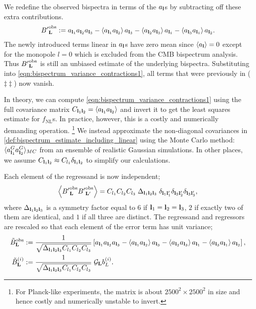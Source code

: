 We redefine the observed bispectra in terms of the $a_\mathbf{l}$s by subtracting off these extra contributions.
\begin{align}
	{B'}^\text{obs}_\mathbf{L} := a_{\mathbf{l}_1} a_{\mathbf{l}_2} a_{\mathbf{l}_3} - \left< a_{\mathbf{l}_1} a_{\mathbf{l}_2} \right> a_{\mathbf{l}_3} - \left< a_{\mathbf{l}_2} a_{\mathbf{l}_3} \right> a_{\mathbf{l}_1} - \left< a_{\mathbf{l}_3} a_{\mathbf{l}_1} \right> a_{\mathbf{l}_2}. \label{def:bispectrum_estimate_including_linear}
\end{align}
The newly introduced terms linear in $a_\mathbf{l}$s have zero mean since $\left< a_\mathbf{l} \right> = 0$ except for the monopole $l=0$ which is excluded from the CMB bispectrum analysis. Thus ${B'}^\text{obs}_\mathbf{L}$ is still an unbiased estimate of the underlying bispectra. Substituting into \eqref{eqn:bispectrum_variance_contractions1}, all terms that were previously in ($\ddagger\ddagger$) now vanish.

In theory, we can compute \eqref{eqn:bispectrum_variance_contractions1} using the full covariance matrix $C_{\mathbf{l}_1 \mathbf{l}_2} = \left< a_{\mathbf{l}_1} a_{\mathbf{l}_2} \right>$ and invert it to get the least squares estimate for $f_\text{NL}$s. In practice, however, this is a costly and numerically demanding operation. \footnote{For Planck-like experiments, the matrix is about $2500^2 \times 2500^2$ in size and hence costly and numerically unstable to invert.} We instead approximate the non-diagonal covariances in \eqref{def:bispectrum_estimate_including_linear} using the Monte Carlo method: $\langle a_{\mathbf{l}_1}^{G} a_{\mathbf{l}_2}^{G} \rangle_{MC}$ from an ensemble of realistic Gaussian simulations. In other places, we assume $C_{\mathbf{l}_1 \mathbf{l}_2} \approx C_{l_1} \delta_{\mathbf{l}_1 \mathbf{l}_2}$ to simplify our calculations.

Each element of the regressand is now independent;
\begin{align}
	\left< {B'}^\text{obs}_\mathbf{L} {B'}^\text{obs}_{\mathbf{L}'} \right> = C_{l_1} C_{l_2} C_{l_3} \; \Delta_{\mathbf{l}_1 \mathbf{l}_2 \mathbf{l}_3} \; \delta_{\mathbf{l}_1 \mathbf{l}'_1} \delta_{\mathbf{l}_2 \mathbf{l}'_2} \delta_{\mathbf{l}_3 \mathbf{l}'_3},
\end{align}
where $\Delta_{\mathbf{l}_1 \mathbf{l}_2 \mathbf{l}_3}$ is a symmetry factor equal to $6$ if $\mathbf{l}_1 = \mathbf{l}_2 = \mathbf{l}_3$, $2$ if exactly two of them are identical, and $1$ if all three are distinct. The regressand and regressors are rescaled so that each element of the error term has unit variance;
\begin{align}
	\tilde{B}^\text{obs}_\mathbf{L} &:= \frac{1}{\sqrt{\Delta_{\mathbf{l}_1 \mathbf{l}_2 \mathbf{l}_3} C_{l_1} C_{l_2} C_{l_3}}} \left[ a_{\mathbf{l}_1} a_{\mathbf{l}_2} a_{\mathbf{l}_3} - \left< a_{\mathbf{l}_1} a_{\mathbf{l}_2} \right> a_{\mathbf{l}_3} - \left< a_{\mathbf{l}_2} a_{\mathbf{l}_3} \right> a_{\mathbf{l}_1} - \left< a_{\mathbf{l}_3} a_{\mathbf{l}_1} \right> a_{\mathbf{l}_2} \right], \\
	\tilde{B}^{(i)}_\mathbf{L} &:= \frac{1}{\sqrt{\Delta_{\mathbf{l}_1 \mathbf{l}_2 \mathbf{l}_3} C_{l_1} C_{l_2} C_{l_3}}} \; \mathcal{G}_{\mathbf{L}} b^{(i)}_{L}.
\end{align}

